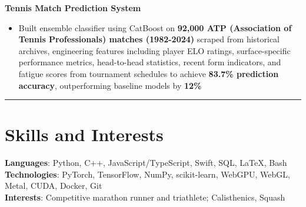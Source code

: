 \documentclass[11pt]{article}
\begin{document}
\vspace{3pt}
\noindent\textbf{Tennis Match Prediction System}
\begin{itemize}[leftmargin=*, topsep=1pt, itemsep=1pt, parsep=0pt]
\item Built ensemble classifier using CatBoost on \textbf{92,000 ATP (Association of Tennis Professionals) matches (1982-2024)} scraped from historical archives, engineering features including player ELO ratings, surface-specific performance metrics, head-to-head statistics, recent form indicators, and fatigue scores from tournament schedules to achieve \textbf{83.7\% prediction accuracy}, outperforming baseline models by \textbf{12\%}
\end{itemize}

\noindent\rule{\textwidth}{0.5pt}

\section*{\textcolor{modernblue}{\Large Skills and Interests}}
\textbf{Languages}: Python, C++, JavaScript/TypeScript, Swift, SQL, LaTeX, Bash\\
\textbf{Technologies}: PyTorch, TensorFlow, NumPy, scikit-learn, WebGPU, WebGL, Metal, CUDA, Docker, Git\\
\textbf{Interests}: Competitive marathon runner and triathlete; Calisthenics, Squash
\end{document}
